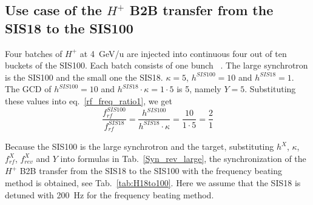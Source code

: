 %
%
\subsection{Use case of the $H^{+}$ B2B transfer from the SIS18 to the SIS100}
\label{sec:cir_no_int1}
Four batches of $H^{+}$ at \SI{4}{GeV/\atomicmassunit} are injected into continuous four out of ten buckets of the SIS100. Each batch consists of one bunch ~\cite{liebermann_fair_2013, liebermann_sis100_2013}. The large synchrotron is the SIS100 and the small one the SIS18. $\kappa=5$, $h^{\mathit{SIS100}}=10$ and $h^{\mathit{SIS18}}=1$. The GCD of $h^{\mathit{SIS100}}=10$ and $h^{\mathit{SIS18}} \cdot \kappa=1\cdot 5$ is 5, namely $Y=5$. Substituting these values into eq.~\ref{rf_freq_ratio1}, we get
\begin{equation}
\frac{f_{\mathit{rf}}^{\mathit{SIS100}}}{f_{\mathit{rf}}^{\mathit{SIS18}}}= \frac {h^{\mathit{SIS100}}}{h^{\mathit{SIS18}} \cdot \kappa}= \frac{10}{1 \cdot 5}=\frac{2}{1}
\end{equation}

Because the SIS100 is the large synchrotron and the target, substituting $h^X$, $\kappa$, $f_{\mathit{rf}}^{X}$, $f_{\mathit{rev}}^{X}$ and $Y$ into formulas in Tab.~\ref{Syn_rev_large}, the synchronization of the $H^{+}$ B2B transfer from the SIS18 to the SIS100 with the frequency beating method is obtained, see Tab.~\ref{tab:H18to100}. Here we assume that the SIS18 is detuned with \SI{200}{Hz} for the frequency beating method. 

